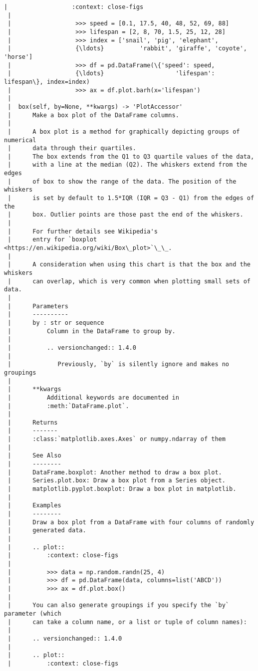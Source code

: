 \documentclass[11pt]{article}
\begin{document}
\begin{Verbatim}[commandchars=\\\{\}]
 |                  :context: close-figs
 |
 |                  >>> speed = [0.1, 17.5, 40, 48, 52, 69, 88]
 |                  >>> lifespan = [2, 8, 70, 1.5, 25, 12, 28]
 |                  >>> index = ['snail', 'pig', 'elephant',
 |                  {\ldots}          'rabbit', 'giraffe', 'coyote', 'horse']
 |                  >>> df = pd.DataFrame(\{'speed': speed,
 |                  {\ldots}                    'lifespan': lifespan\}, index=index)
 |                  >>> ax = df.plot.barh(x='lifespan')
 |
 |  box(self, by=None, **kwargs) -> 'PlotAccessor'
 |      Make a box plot of the DataFrame columns.
 |
 |      A box plot is a method for graphically depicting groups of numerical
 |      data through their quartiles.
 |      The box extends from the Q1 to Q3 quartile values of the data,
 |      with a line at the median (Q2). The whiskers extend from the edges
 |      of box to show the range of the data. The position of the whiskers
 |      is set by default to 1.5*IQR (IQR = Q3 - Q1) from the edges of the
 |      box. Outlier points are those past the end of the whiskers.
 |
 |      For further details see Wikipedia's
 |      entry for `boxplot <https://en.wikipedia.org/wiki/Box\_plot>`\_\_.
 |
 |      A consideration when using this chart is that the box and the whiskers
 |      can overlap, which is very common when plotting small sets of data.
 |
 |      Parameters
 |      ----------
 |      by : str or sequence
 |          Column in the DataFrame to group by.
 |
 |          .. versionchanged:: 1.4.0
 |
 |             Previously, `by` is silently ignore and makes no groupings
 |
 |      **kwargs
 |          Additional keywords are documented in
 |          :meth:`DataFrame.plot`.
 |
 |      Returns
 |      -------
 |      :class:`matplotlib.axes.Axes` or numpy.ndarray of them
 |
 |      See Also
 |      --------
 |      DataFrame.boxplot: Another method to draw a box plot.
 |      Series.plot.box: Draw a box plot from a Series object.
 |      matplotlib.pyplot.boxplot: Draw a box plot in matplotlib.
 |
 |      Examples
 |      --------
 |      Draw a box plot from a DataFrame with four columns of randomly
 |      generated data.
 |
 |      .. plot::
 |          :context: close-figs
 |
 |          >>> data = np.random.randn(25, 4)
 |          >>> df = pd.DataFrame(data, columns=list('ABCD'))
 |          >>> ax = df.plot.box()
 |
 |      You can also generate groupings if you specify the `by` parameter (which
 |      can take a column name, or a list or tuple of column names):
 |
 |      .. versionchanged:: 1.4.0
 |
 |      .. plot::
 |          :context: close-figs

\end{Verbatim}
\end{document}
